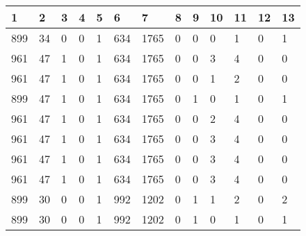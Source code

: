 \begin{table}[H]
\begin{tabular}{|l|l|l|l|l|l|l|l|l|l|l|l|l|}
\hline
\textbf{1} & \textbf{2} & \textbf{3} & \textbf{4} & \textbf{5} & \textbf{6} & \textbf{7} & \textbf{8} & \textbf{9} & \textbf{10} & \textbf{11} & \textbf{12} & \textbf{13} \\ \hline
899  &  34  &  0  &  0  &  1  &  634  &  1765  &  0  &  0  &  0  &  1  &  0  &  1 \\ \hline
961  &  47  &  1  &  0  &  1  &  634  &  1765  &  0  &  0  &  3  &  {\color[HTML]{FE0000}4}  &  0  &  0 \\ \hline
961  &  47  &  1  &  0  &  1  &  634  &  1765  &  0  &  0  &  1  &  2  &  0  &  0 \\ \hline
899  &  47  &  1  &  0  &  1  &  634  &  1765  &  0  &  1  &  0  &  1  &  0  &  1 \\ \hline
961  &  47  &  1  &  0  &  1  &  634  &  1765  &  0  &  0  &  2  &  {\color[HTML]{FE0000}4}  &  0  &  0 \\ \hline
961  &  47  &  1  &  0  &  1  &  634  &  1765  &  0  &  0  &  3  &  {\color[HTML]{FE0000}4}  &  0  &  0 \\ \hline
961  &  47  &  1  &  0  &  1  &  634  &  1765  &  0  &  0  &  3  &  {\color[HTML]{FE0000}4}  &  0  &  0 \\ \hline
961  &  47  &  1  &  0  &  1  &  634  &  1765  &  0  &  0  &  3  &  {\color[HTML]{FE0000}4}  &  0  &  0 \\ \hline
899  &  30  &  0  &  0  &  1  &  992  &  1202  &  0  &  1  &  1  &  2  &  0  &  2 \\ \hline
899  &  30  &  0  &  0  &  1  &  992  &  1202  &  0  &  1  &  0  &  1  &  0  &  1 \\ \hline
\end{tabular}
\end{table}

